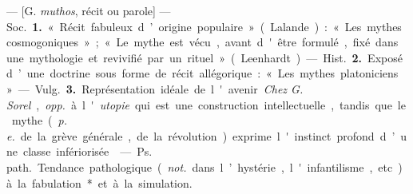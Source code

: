 \begin{itemize}[leftmargin=1cm, label=, itemsep=1pt]
 — [G. {\it muthos}, récit ou parole] — \si{Soc.} {\bf 1.} « Récit
fabuleux d’origine populaire » (Lalande) : « Les mythes cosmogoniques » ;
« Le mythe est vécu, avant d'être formulé, fixé dans une mythologie et
revivifié par un rituel » (Leenhardt).

— \si{Hist.} {\bf 2.} Exposé d’une doctrine sous forme de récit allégorique :
« Les mythes platoniciens ».

— \si{Vulg.} {\bf 3.} Représentation idéale de l'avenir. {\it Chez G. Sorel},
{\it opp.} à l'{\it utopie} qui est une construction intellectuelle, tandis
que le mythe ({\it p. e.} de la grève générale, de la révolution) exprime
l'instinct profond d’une classe infériorisée.

 — \si{Ps. path.} Tendance pathologique ({\it not.} dans
l’hystérie, l'infantilisme, etc.) à la fabulation* et à la simulation.

	\end{itemize}

